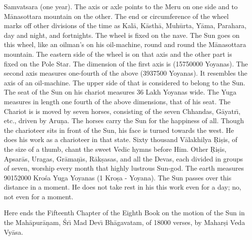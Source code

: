 Samvatsara (one year). The axis or axle points to the Meru on one side and to M\=anasottara mountain on the other. The end or circumference of the wheel marks off other divisions of the time as Kal\=a, K\=asth\=a, Muh\=urta, Y\=ama, Parahara, day and night, and fortnights. The wheel is fixed on the nave. The Sun goes on this wheel, like an oilman's on his oil-machine, round and round the M\=anasottara mountain. The eastern side of the wheel is on that axis and the other part is fixed on the Pole Star. The dimension of the first axis is (15750000 Yoyanas). The second axis measures one-fourth of the above (3937500 Yoyanas). It resembles the axis of an oil-machine. The upper side of that is considered to belong to the Sun. The seat of the Sun on his chariot measures 36 Lakh Yoyanas wide. The Yuga measures in length one fourth of the above dimensions, that of his seat. The Chariot is is moved by seven horses, consisting of the seven Chhandas, G\=ayatr\={\i}, etc., driven by Aru\d{n}a. The horses carry the Sun for the happiness of all. Though the charioteer sits in front of the Sun, his face is turned towards the west. He does his work as a charioteer in that state. Sixty thousand V\=alakhilya \d{R}i\d{s}is, of the size of a thumb, chant the sweet Vedic hymns before Him. Other \d{R}i\d{s}is, Apsar\=as, Uragas, Gr\=ama\d{n}\={\i}s, R\=ak\d{s}asas, and all the Devas, each divided in groups of seven, worship every month that highly lustrous Sun-god. The earth measures 90152000 Kro\'sa Yuga Yoyanas (1 Kro\d{s}a -  Yoyana). The Sun passes over this distance in a moment. He does not take rest in his this work even for a day; no, not even for a moment.

Here ends the Fifteenth Chapter of the Eighth Book on the motion of the Sun in the Mah\=apur\=a\d{n}am, \'Sr\={\i} Mad Dev\={\i} Bh\=agavatam, of 18000 verses, by Mahar\d{s}i Veda Vy\=asa.



